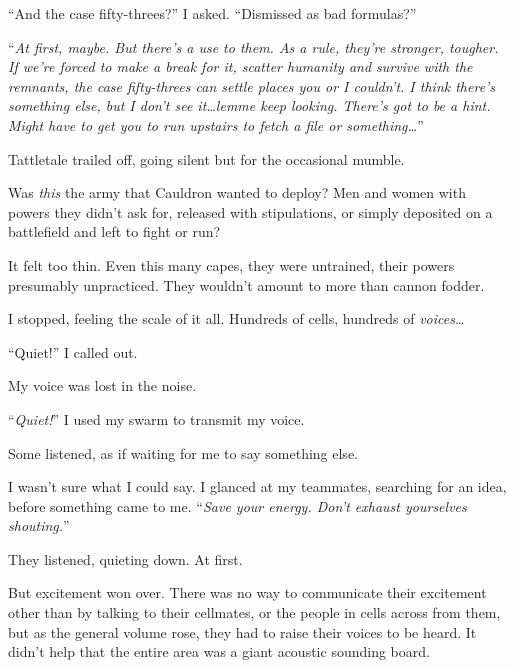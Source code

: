 ``And the case fifty-threes?'' I asked.  ``Dismissed as bad formulas?''



``\emph{At first, maybe.  But there's a use to them.  As a rule, they're stronger, tougher.  If we're forced to make a break for it, scatter humanity and survive with the remnants, the case fifty-threes can settle places you or I couldn't.  I think there's something else, but I don't see it\ldots lemme keep looking.  There's got to be a hint.  Might have to get you to run upstairs to fetch a file or something\ldots}''



Tattletale trailed off, going silent but for the occasional mumble.



Was \emph{this} the army that Cauldron wanted to deploy?  Men and women with powers they didn't ask for, released with stipulations, or simply deposited on a battlefield and left to fight or run?



It felt too thin.  Even this many capes, they were untrained, their powers presumably unpracticed.  They wouldn't amount to more than cannon fodder.



I stopped, feeling the scale of it all.  Hundreds of cells, hundreds of \emph{voices}\ldots



``Quiet!''  I called out.



My voice was lost in the noise.



``\emph{Quiet!}''  I used my swarm to transmit my voice.



Some listened, as if waiting for me to say something else.



I wasn't sure what I could say.  I glanced at my teammates, searching for an idea, before something came to me.  ``\emph{Save your energy.  Don't exhaust yourselves shouting.}''



They listened, quieting down.  At first.



But excitement won over.  There was no way to communicate their excitement other than by talking to their cellmates, or the people in cells across from them, but as the general volume rose, they had to raise their voices to be heard.  It didn't help that the entire area was a giant acoustic sounding board.



